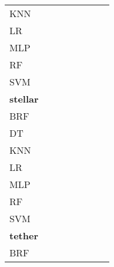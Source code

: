 \documentclass{article}
\begin{document}
{\begin{tabular}{|l|c|c|c|c|c|c|c|}
KNN & \cellcolor{white}  & \cellcolor{black}  & \cellcolor{gray}  & \cellcolor{white}  & \cellcolor{black}  & \cellcolor{white}  & \cellcolor{black}  \\ 
LR & \cellcolor{white}  & \cellcolor{white}  & \cellcolor{white}  & \cellcolor{gray}  & \cellcolor{white}  & \cellcolor{white}  & \cellcolor{white}  \\ 
MLP & \cellcolor{white}  & \cellcolor{white}  & \cellcolor{white}  & \cellcolor{white}  & \cellcolor{gray}  & \cellcolor{white}  & \cellcolor{white}  \\ 
RF & \cellcolor{white}  & \cellcolor{black}  & \cellcolor{white}  & \cellcolor{white}  & \cellcolor{black}  & \cellcolor{gray}  & \cellcolor{black}  \\ 
SVM & \cellcolor{white}  & \cellcolor{white}  & \cellcolor{white}  & \cellcolor{white}  & \cellcolor{white}  & \cellcolor{white}  & \cellcolor{gray}  \\ 
\hline
\textbf{stellar} \\ \hline
BRF & \cellcolor{gray}  & \cellcolor{black}  & \cellcolor{white}  & \cellcolor{black}  & \cellcolor{black}  & \cellcolor{white}  & \cellcolor{black}  \\ 
DT & \cellcolor{white}  & \cellcolor{gray}  & \cellcolor{white}  & \cellcolor{white}  & \cellcolor{black}  & \cellcolor{white}  & \cellcolor{black}  \\ 
KNN & \cellcolor{white}  & \cellcolor{white}  & \cellcolor{gray}  & \cellcolor{white}  & \cellcolor{black}  & \cellcolor{white}  & \cellcolor{black}  \\ 
LR & \cellcolor{white}  & \cellcolor{white}  & \cellcolor{white}  & \cellcolor{gray}  & \cellcolor{white}  & \cellcolor{white}  & \cellcolor{white}  \\ 
MLP & \cellcolor{white}  & \cellcolor{white}  & \cellcolor{white}  & \cellcolor{white}  & \cellcolor{gray}  & \cellcolor{white}  & \cellcolor{white}  \\ 
RF & \cellcolor{white}  & \cellcolor{black}  & \cellcolor{white}  & \cellcolor{black}  & \cellcolor{black}  & \cellcolor{gray}  & \cellcolor{black}  \\ 
SVM & \cellcolor{white}  & \cellcolor{white}  & \cellcolor{white}  & \cellcolor{black}  & \cellcolor{black}  & \cellcolor{white}  & \cellcolor{gray}  \\ 
\hline
\textbf{tether} \\ \hline
BRF & \cellcolor{gray}  & \cellcolor{black}  & \cellcolor{black}  & \cellcolor{white}  & \cellcolor{black}  & \cellcolor{black}  & \cellcolor{black}  \\ 

\end{tabular}}
\end{document}

